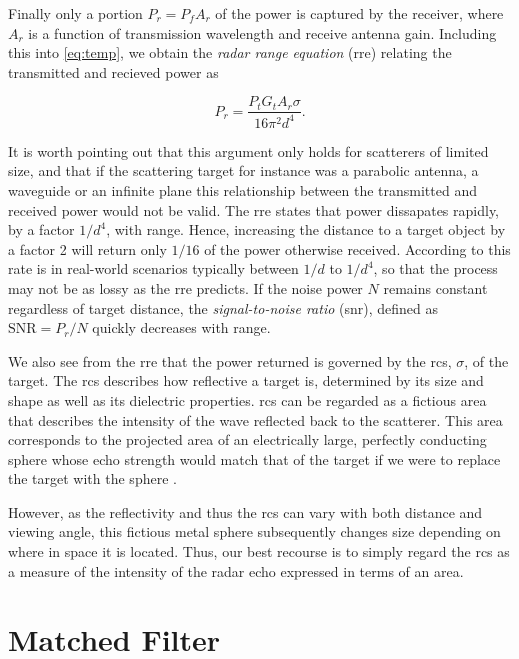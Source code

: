 Finally only a portion $P_r = P_fA_r$ of the power is captured by the receiver, where $A_r$ is a function of transmission wavelength and receive antenna gain. Including this into \eqref{eq:temp}, we obtain the \emph{radar range equation} (\gls{rre}) relating the transmitted and recieved power as

\begin{equation}
	P_r
	= \frac{P_t G_t A_r \sigma}{16\pi^2 d^4}.
\end{equation}

It is worth pointing out that this argument only holds for scatterers of limited size, and that if the scattering target for instance was a parabolic antenna, a waveguide or an infinite plane this relationship between the transmitted and received power would not be valid. The \gls{rre} states that power dissapates rapidly, by a factor $1/d^4$, with range. Hence, increasing the distance to a target object by a factor 2 will return only $1/16$ of the power otherwise received. According to \citep{richards_2014} this rate is in real-world scenarios typically between $1/d$ to $1/d^4$, so that the process may not be as lossy as the \gls{rre} predicts. If the noise power $N$ remains constant regardless of target distance, the \emph{signal-to-noise ratio} (\gls{snr}), defined as $\text{SNR} = P_r/N$ quickly decreases with range. 

We also see from the \gls{rre} that the power returned is governed by the \gls{rcs}, $\sigma$, of the target. The \gls{rcs} describes how reflective a target is, determined by its size and shape as well as its dielectric properties. \gls{rcs} can be regarded as a fictious area that describes the intensity of the wave reflected back to the scatterer. This area corresponds to the projected area of an electrically large, perfectly conducting sphere whose echo strength would match that of the target if we were to replace the target with the sphere \citep{knott_1993}. 

However, as the reflectivity and thus the \gls{rcs} can vary with both distance and viewing angle, this fictious metal sphere subsequently changes size depending on where in space it is located. Thus, our best recourse is to simply regard the \gls{rcs} as a measure of the intensity of the radar echo expressed in terms of an area. 

\section{Matched Filter}


